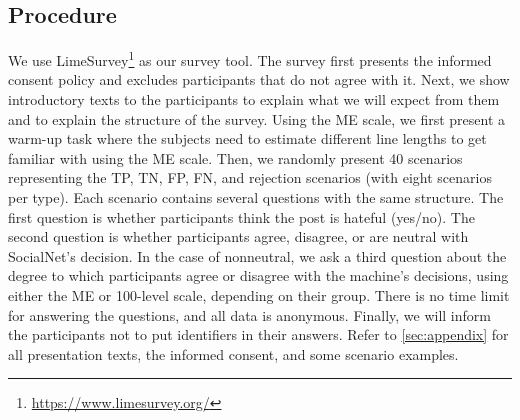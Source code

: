 \subsection{Procedure}
We use LimeSurvey\footnote{\url{https://www.limesurvey.org/}} as our survey tool.
%
The survey first presents the informed consent policy and excludes participants that do not agree with it.
%
Next, we show introductory texts to the participants to explain what we will expect from them and to explain the structure of the survey.
%
Using the ME scale, we first present a warm-up task where the subjects need to estimate different line lengths to get familiar with using the ME scale.
%
Then, we randomly present 40 scenarios representing the TP, TN, FP, FN, and rejection scenarios (with eight scenarios per type).
%
Each scenario contains several questions with the same structure.
%
The first question is whether participants think the post is hateful (yes/no).
%
The second question is whether participants agree, disagree, or are neutral with SocialNet's decision.
%
In the case of nonneutral, we ask a third question about the degree to which participants agree or disagree with the machine's decisions, using either the ME or 100-level scale, depending on their group.
%
There is no time limit for answering the questions, and all data is anonymous.
%
Finally, we will inform the participants not to put identifiers in their answers.
%
Refer to \autoref{sec:appendix} for all presentation texts, the informed consent, and some scenario examples.

